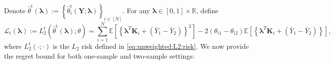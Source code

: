 \documentclass[12pt,letterpaper]{article}
\begin{document}
Denote $\hat{\theta}^{\mathrm{t}}(\boldsymbol{\lambda}):=\left\{\hat{\theta}_i^{\mathrm{t}}(\mathbf{Y};\boldsymbol{\lambda})\right\}_{i\in[N]}$. For any $\boldsymbol{\lambda}\in[0,1]\times\mathbb{R}$, define 
\begin{equation}\label{eq:loss:two-sample:lambda}
    \mathcal{L}_{\mathrm{t}}(\boldsymbol{\lambda}) :=  L_2^{\mathrm{t}}(\hat{\theta}^{\mathrm{t}}(\boldsymbol{\lambda});\theta)=\sum_{i=1}^N\mathbb{E}\left[\left\{\boldsymbol{\lambda}^T\mathbf{K}_i+(\bar{Y}_1-\bar{Y}_2)\right\}^2\right]-2(\theta_{i1}-\theta_{i2})\mathbb{E}\left[\left\{\boldsymbol{\lambda}^T\mathbf{K}_i+(\bar{Y}_1-\bar{Y}_2)\right\}\right],
\end{equation}
where $L_2^{\mathrm{t}}(\cdot;\cdot)$ is the $L_2$ risk defined in \eqref{eq:unweighted:L2:risk}. We now provide the regret bound for both one-sample and two-sample settings:
\end{document}
